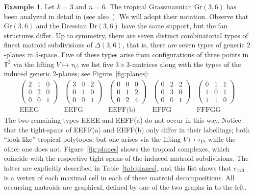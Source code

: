 \documentclass[11pt,a4paper]{amsart}
\newcommand{\TT}{{\mathbb{T}}}
\newcommand{\Gr}[2]{{\mathrm{Gr}(#1,#2)}}
\newcommand{\Dr}[2]{{\mathrm{Dr}(#1,#2)}}
\theoremstyle{plain}
\theoremstyle{definition}
\newtheorem{example}[theorem]{Example}
\begin{document}
\begin{example}\label{exmp:k=3,n=6}
  Let $k=3$ and $n=6$.  The tropical Grassmannian $\Gr{3}{6}$ has been analyzed in detail in
  \cite{MR2071813} (see also~\cite[Fig.~1]{MR2515769}). We will adopt their
  notation.  Observe that $\Gr36$ and the Dressian $\Dr36$ have the same support, but the
  fan structures differ.  Up to symmetry, there are seven distinct combinatorial types of finest
  matroid subdivisions of $\Delta(3,6)$, that is, there are seven types of generic $2$-planes in
  $5$-space.  Five of these types arise from configurations of three points in $\TT^2$ via the
  lifting $V\mapsto\tau_V$; we list five $3\times3$-matrices along with the types of the induced
  generic $2$-planes; see Figure~\ref{fig:planes}:
  \[
  \begin{array}{ccccc}
    \begin{pmatrix} 2 & 1 & 0 \\ 0 & 2 & 0 \\ 0 & 0 & 1 \end{pmatrix} &
    \begin{pmatrix} 3 & 0 & 2 \\ 0 & 1 & 0 \\ 0 & 0 & 1 \end{pmatrix} &
    \begin{pmatrix} 0 & 0 & 0 \\ 0 & 1 & 2 \\ 0 & 2 & 4 \end{pmatrix} &
    \begin{pmatrix} 0 & 2 & 2 \\ 0 & 3 & 0 \\ 0 & 0 & 1 \end{pmatrix} &
    \begin{pmatrix} 0 & 1 & 1 \\ 1 & 0 & 1 \\ 1 & 1 & 0 \end{pmatrix} \\[1.75em]
    \text{EEEG} & \text{EEFG} & \text{EEFF(b)} & \text{EFFG} & \text{FFFGG}
  \end{array}
  \]
  The two remaining types EEEE and EEFF(a) do not occur in this way.  Notice that the tight-spans of
  EEFF(a) and EEFF(b) only differ in their labellings; both ``look like'' tropical polytopes, but
  one arises via the lifting $V\mapsto\tau_V$, while the other one does not.
  Figure~\ref{fig:planes} shows the tropical complexes, which coincide with the respective tight
  spans of the induced matroid subdivisions.  The latter are explicitly described in
  Table~\ref{tab:planes}, and this list shows that $e_{123}$ is a vertex of each maximal cell in
  each of these matroid decompositions. All occurring matroids are graphical, defined by one of the two
  graphs in \cite[Fig.~7]{MR2515769} to the left.
\end{example}
\end{document}
